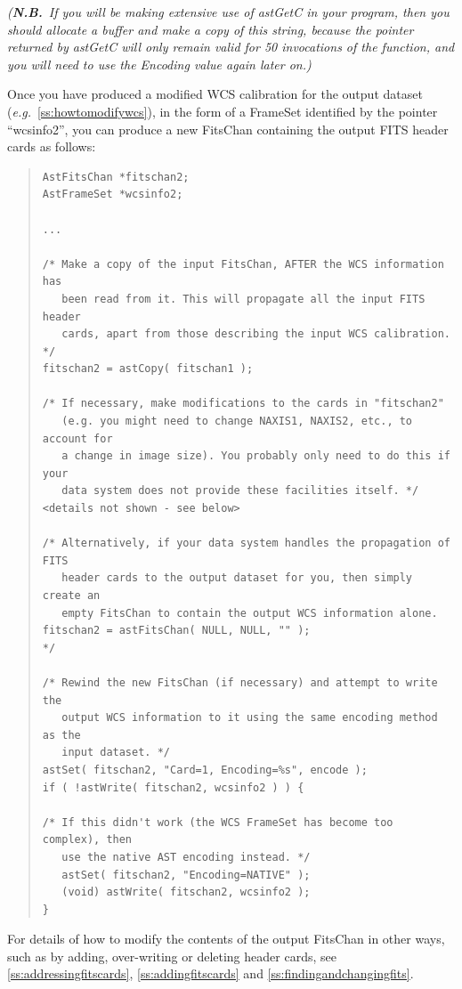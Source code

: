 \documentclass[twoside,11pt]{article}
\newcommand{\htmlref}[2]{#1}
\newcommand{\secref}[1]{\S\ref{#1}}
\renewcommand{\secref}[1]{\ref{#1}}
\begin{document}
{\em{({\bf{N.B.}}\ If you will be making extensive use of astGetC in
your program, then you should allocate a buffer and make a copy of
this string, because the pointer returned by astGetC will only remain
valid for 50 invocations of the function, and you will need to use the
\htmlref{Encoding}{Encoding} value again later on.)}}

Once you have produced a modified WCS calibration for the output
dataset ({\em{e.g.}}\ \secref{ss:howtomodifywcs}), in the form of a
\htmlref{FrameSet}{FrameSet} identified by the pointer ``wcsinfo2'', you can produce a new
\htmlref{FitsChan}{FitsChan} containing the output FITS header cards as follows:

\begin{quote}
\small
\begin{verbatim}
AstFitsChan *fitschan2;
AstFrameSet *wcsinfo2;

...

/* Make a copy of the input FitsChan, AFTER the WCS information has
   been read from it. This will propagate all the input FITS header
   cards, apart from those describing the input WCS calibration. */
fitschan2 = astCopy( fitschan1 );

/* If necessary, make modifications to the cards in "fitschan2"
   (e.g. you might need to change NAXIS1, NAXIS2, etc., to account for
   a change in image size). You probably only need to do this if your
   data system does not provide these facilities itself. */
<details not shown - see below>

/* Alternatively, if your data system handles the propagation of FITS
   header cards to the output dataset for you, then simply create an
   empty FitsChan to contain the output WCS information alone.
fitschan2 = astFitsChan( NULL, NULL, "" );
*/

/* Rewind the new FitsChan (if necessary) and attempt to write the
   output WCS information to it using the same encoding method as the
   input dataset. */
astSet( fitschan2, "Card=1, Encoding=%s", encode );
if ( !astWrite( fitschan2, wcsinfo2 ) ) {

/* If this didn't work (the WCS FrameSet has become too complex), then
   use the native AST encoding instead. */
   astSet( fitschan2, "Encoding=NATIVE" );
   (void) astWrite( fitschan2, wcsinfo2 );
}
\end{verbatim}
\normalsize
\end{quote}

For details of how to modify the contents of the output FitsChan in
other ways, such as by adding, over-writing or deleting header cards,
see \secref{ss:addressingfitscards}, \secref{ss:addingfitscards} and
\secref{ss:findingandchangingfits}.
\end{document}
